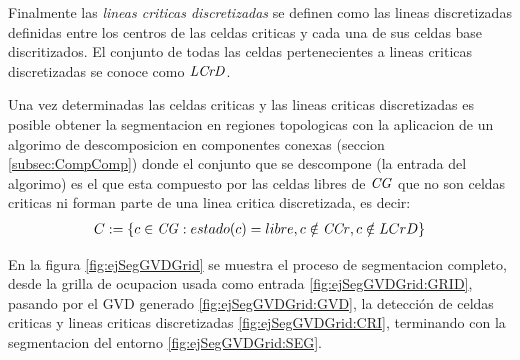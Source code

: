






Finalmente las \emph{lineas criticas discretizadas} se definen como las lineas
discretizadas \cite{foleyphillips} definidas entre los centros de las celdas
criticas y cada una de sus celdas base discritizados. El conjunto de todas las
celdas pertenecientes a lineas criticas discretizadas se conoce como
$\mathit{LCrD}$.

Una vez determinadas las celdas criticas y las lineas criticas discretizadas es
posible obtener la segmentacion en regiones topologicas con la aplicacion de un
algorimo de descomposicion en componentes conexas (seccion
\ref{subsec:CompComp}) donde el conjunto que se descompone (la entrada del
algorimo) es el que esta compuesto por las celdas libres de $\mathit{CG}$ que no son
celdas criticas ni forman parte de una linea critica discretizada, es decir: 
\begin{align*}
C := \{ c \in \mathit{CG} : estado(c) = libre, c \notin \mathit{CCr}, c \notin{LCrD}\}
\end{align*}

En la figura \ref{fig:ejSegGVDGrid} se muestra el proceso de segmentacion
completo, desde la grilla de ocupacion usada como entrada
\ref{fig:ejSegGVDGrid:GRID}, pasando por el GVD generado
\ref{fig:ejSegGVDGrid:GVD}, la detección de celdas criticas y lineas criticas discretizadas
\ref{fig:ejSegGVDGrid:CRI}, terminando con la segmentacion del entorno
\ref{fig:ejSegGVDGrid:SEG}.

